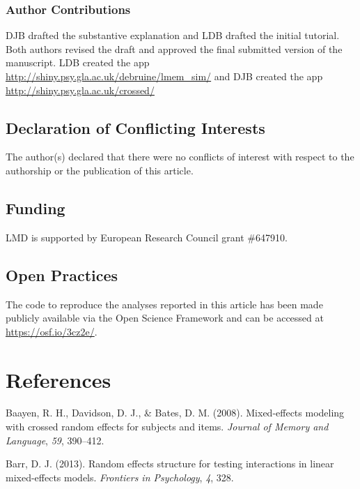\documentclass[doc,floatsintext]{apa6}
\begin{document}
\subsubsection{Author Contributions}\label{author-contributions}

DJB drafted the substantive explanation and LDB drafted the initial
tutorial. Both authors revised the draft and approved the final
submitted version of the manuscript. LDB created the app
\url{http://shiny.psy.gla.ac.uk/debruine/lmem_sim/} and DJB created the
app \url{http://shiny.psy.gla.ac.uk/crossed/}

\subsection{Declaration of Conflicting
Interests}\label{declaration-of-conflicting-interests}

The author(s) declared that there were no conflicts of interest with
respect to the authorship or the publication of this article.

\subsection{Funding}\label{funding}

LMD is supported by European Research Council grant \#647910.

\subsection{Open Practices}\label{open-practices}

The code to reproduce the analyses reported in this article has been
made publicly available via the Open Science Framework and can be
accessed at \url{https://osf.io/3cz2e/}.

\newpage

\section{References}\label{references}

\begingroup
\setlength{\parindent}{-0.5in} \setlength{\leftskip}{0.5in}

\hypertarget{refs}{}
\hypertarget{ref-baayen_davidson_bates_2008}{}
Baayen, R. H., Davidson, D. J., \& Bates, D. M. (2008). Mixed-effects
modeling with crossed random effects for subjects and items.
\emph{Journal of Memory and Language}, \emph{59}, 390--412.

\hypertarget{ref-barr_2013}{}
Barr, D. J. (2013). Random effects structure for testing interactions in
linear mixed-effects models. \emph{Frontiers in Psychology}, \emph{4},
328.
\end{document}
